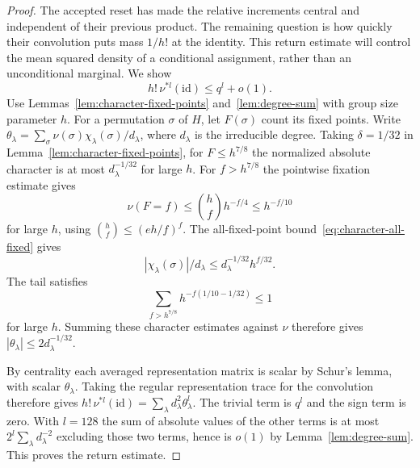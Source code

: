 \begin{proof}
The accepted reset has made the relative increments central and independent of their previous product. The remaining question is how quickly their convolution puts mass $1/h!$ at the identity. This return estimate will control the mean squared density of a conditional assignment, rather than an unconditional marginal. We show
\[
h!\,\nu^{*l}(\mathrm{id})\le q^l+o(1).
\]
Use Lemmas~\ref{lem:character-fixed-points} and~\ref{lem:degree-sum} with group size parameter $h$. For a permutation $\sigma$ of $H$, let $F(\sigma)$ count its fixed points. Write \(\theta_\lambda=\sum_\sigma\nu(\sigma)\chi_\lambda(\sigma)/d_\lambda\), where $d_\lambda$ is the irreducible degree. Taking $\delta=1/32$ in Lemma~\ref{lem:character-fixed-points}, for \(F\le h^{7/8}\) the normalized absolute character is at most \(d_\lambda^{-1/32}\) for large \(h\). For \(f>h^{7/8}\) the pointwise fixation estimate gives
\[
\nu(F=f)\le \binom h f h^{-f/4}\le h^{-f/10}
\]
for large \(h\), using \(\binom h f\le(eh/f)^f\). The all-fixed-point bound~\eqref{eq:character-all-fixed} gives
\[
|\chi_\lambda(\sigma)|/d_\lambda\le d_\lambda^{-1/32} h^{f/32}.
\]
The tail satisfies
\[
 \sum_{f>h^{7/8}}h^{-f(1/10-1/32)}\le 1
\]
for large $h$. Summing these character estimates against \(\nu\) therefore gives \(|\theta_\lambda|\le 2 d_\lambda^{-1/32}\).

By centrality each averaged representation matrix is scalar by Schur's lemma, with scalar \(\theta_\lambda\). Taking the regular representation trace for the convolution therefore gives \(h!\,\nu^{*l}(\mathrm{id})=\sum_\lambda d_\lambda^2 \theta_\lambda^l\). The trivial term is \(q^l\) and the sign term is zero. With \(l=128\) the sum of absolute values of the other terms is at most \(2^l\sum_\lambda d_\lambda^{-2}\) excluding those two terms, hence is \(o(1)\) by Lemma~\ref{lem:degree-sum}. This proves the return estimate.


\end{proof}
